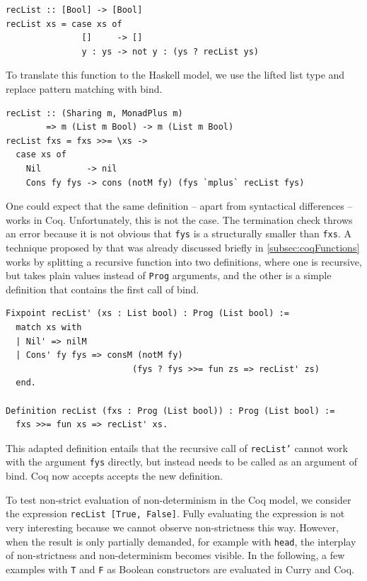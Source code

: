 \documentclass[a4paper, 11pt, fleqn, twoside]{scrreprt}
\newcommand{\hinl}[1]{\texttt{#1}}
\newcommand{\cinl}[1]{\texttt{#1}}
\begin{document}
\begin{verbatim}
recList :: [Bool] -> [Bool]
recList xs = case xs of
               []     -> []
               y : ys -> not y : (ys ? recList ys)
\end{verbatim}

To translate this function to the Haskell model, we use the lifted list type and replace pattern matching with bind.

\begin{verbatim}
recList :: (Sharing m, MonadPlus m) 
        => m (List m Bool) -> m (List m Bool)
recList fxs = fxs >>= \xs ->
  case xs of
    Nil         -> nil
    Cons fy fys -> cons (notM fy) (fys `mplus` recList fys)
\end{verbatim}

One could expect that the same definition -- apart from syntactical differences -- works in Coq.
Unfortunately, this is not the case.
The termination check throws an error because it is not obvious that \hinl{fys} is a structurally smaller than \hinl{fxs}.
A technique proposed by \citet{dylus2019oneMonad} that was already discussed briefly in \autoref{subsec:coqFunctions} works by splitting a recursive function into two definitions, where one is recursive, but takes plain values instead of \cinl{Prog} arguments, and the other is a simple definition that contains the first call of bind.

\begin{verbatim}
Fixpoint recList' (xs : List bool) : Prog (List bool) :=
  match xs with
  | Nil' => nilM
  | Cons' fy fys => consM (notM fy)
                         (fys ? fys >>= fun zs => recList' zs)
  end.

Definition recList (fxs : Prog (List bool)) : Prog (List bool) :=
  fxs >>= fun xs => recList' xs.
\end{verbatim}

This adapted definition entails that the recursive call of \hinl{recList'} cannot work with the argument \cinl{fys} directly, but instead needs to be called as an argument of bind.
Coq  now accepts accepts the new definition.

To test non-strict evaluation of non-determinism in the Coq model, we consider the expression \hinl{recList [True, False]}.
Fully evaluating the expression is not very interesting because we cannot observe non-strictness this way.
However, when the result is only partially demanded, for example with \cinl{head}, the interplay of non-strictness and non-determinism becomes visible.
In the following, a few examples with \hinl{T} and \hinl{F} as Boolean constructors are evaluated in Curry and Coq.
\end{document}
